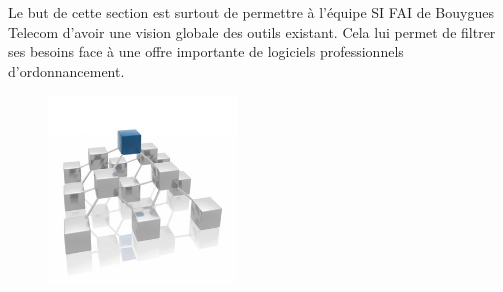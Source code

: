 \documentclass{bouygues-fr}
\begin{document}
 Le but de cette section est surtout de permettre à l'équipe SI FAI de Bouygues Telecom d'avoir une vision globale des outils existant. Cela lui permet de filtrer ses besoins face à une offre importante de logiciels professionnels d’ordonnancement.
 \begin{figure}[H]
      \includegraphics[width=5cm]{ordonnanceurs.jpg}
  \end{figure}
\end{document}
